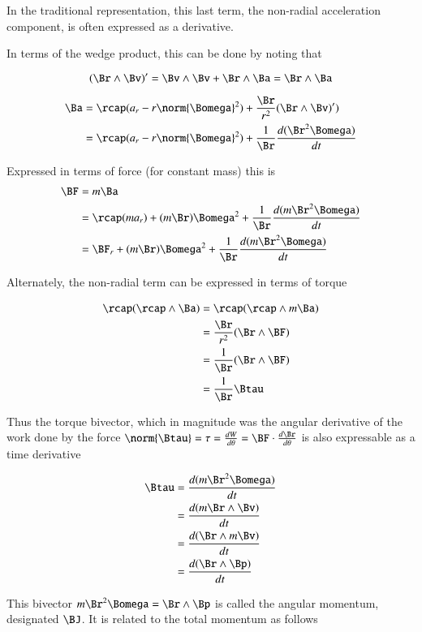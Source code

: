 \documentclass{article}
\newcommand{\dt}[1]{\frac{d {#1}}{dt}}
\newcommand{\dtheta}[1]{\frac{d {#1}}{d \theta}}
\begin{document}
In the traditional representation, this last term, the non-radial acceleration
component, is often expressed as a derivative.

In terms of the wedge product, this can be done by noting that

\[
(\Br \wedge \Bv)' = \Bv \wedge \Bv + \Br \wedge \Ba = \Br \wedge \Ba
\]

\begin{align*}
\Ba 
   &= \rcap( a_r - r \norm{\Bomega}^2 ) + \frac{\Br}{r^2}(\Br \wedge \Bv)') \\
   &= \rcap( a_r - r \norm{\Bomega}^2 ) + \frac{1}{\Br}\dt{(\Br^2 \Bomega)} \\
\end{align*}

Expressed in terms of force (for constant mass) this is
\begin{align*}
\BF &= m \Ba \\
    &= \rcap (m a_r) + (m \Br) {\Bomega}^2
       + \frac{1}{\Br}\dt{(m \Br^2 \Bomega)} \\
    &= \BF_r + (m \Br) {\Bomega}^2
             + \frac{1}{\Br}\dt{(m \Br^2 \Bomega)} \\
\end{align*}

Alternately, the non-radial term can be expressed in terms of torque

\begin{align*}
\rcap (\rcap \wedge \Ba) 
   &= \rcap (\rcap \wedge m \Ba)  \\
   &= \frac{\Br}{r^2} (\Br \wedge \BF)  \\
   &= \frac{1}{\Br} (\Br \wedge \BF)  \\
   &= \frac{1}{\Br} \Btau \\
\end{align*}

Thus the torque bivector, which in magnitude was the angular derivative of
the work
done by the force $\norm{\Btau} = \tau = \dtheta{W} = \BF \cdot \dtheta{\Br}$
is also expressable as a time derivative

\begin{align*}
\Btau 
&= \dt{( m \Br^2 \Bomega )}  \\
&= \dt{( m \Br \wedge \Bv)}  \\
&= \dt{( \Br \wedge m \Bv)}  \\
&= \dt{( \Br \wedge \Bp  )}  \\
\end{align*}

This bivector $m \Br^2 \Bomega = \Br \wedge \Bp$ is called the angular
momentum, designated $\BJ$.  It is related to the total momentum as follows
\end{document}
